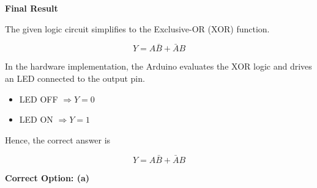 \documentclass[12pt,a4paper]{article}
\begin{document}
\begin{resultbox}
\begin{center}

\textbf{\Large Final Result}

\vspace{0.3cm}

The given logic circuit simplifies to the
Exclusive-OR (XOR) function.

\vspace{0.3cm}

\[
Y=A\bar{B}+\bar{A}B
\]

\vspace{0.3cm}

In the hardware implementation, the Arduino evaluates
the XOR logic and drives an LED connected to the output pin.

\begin{itemize}
\item LED OFF $\Rightarrow Y=0$
\item LED ON $\Rightarrow Y=1$
\end{itemize}

\vspace{0.2cm}

Hence, the correct answer is

\[
\boxed{Y=A\bar{B}+\bar{A}B}
\]

\vspace{0.3cm}

\textbf{Correct Option: (a)}

\end{center}

\end{resultbox}
\end{document}
